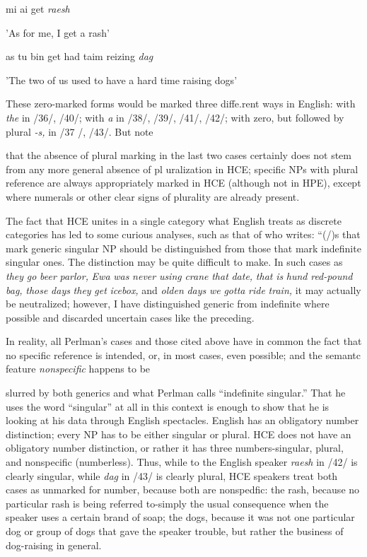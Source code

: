 \ea\label{ex:42}
mi ai get \textit{raesh}
\glt
\z

'As for me, I get a rash'

\ea\label{ex:43}
as tu bin get had taim reizing \textit{dag}
\glt
\z

'The two of us used to have a hard time raising dogs'

These zero-marked forms would be marked three diffe.rent ways in English: with \textit{the }in /36/, /40/; with \textit{a} in /38/, /39/, /41/, /42/; with zero, but followed by plural \textit{{}-s, }in /37 /, /43/. But note

that the absence of plural marking in the last two cases certainly does not stem from any more general absence of pl uralization in HCE; specific NPs with plural reference are always appropriately marked in HCE (although not in HPE), except where numerals or other clear signs of plurality are already present.

The fact that HCE unites in a single category what English treats as discrete categories has led to some curious analyses, such as that of \citet[99]{Perlman1973} who writes: ``(/)s that mark generic singular NP should be distinguished from those that mark indefinite singular ones. The distinction may be quite difficult to make. In such cases as \textit{they} \textit{go} \textit{beer} \textit{parlor,} \textit{Ewa} \textit{was} \textit{never} \textit{using} \textit{crane} \textit{that} \textit{date,} \textit{that} \textit{is} \textit{hund} \textit{red-pound} \textit{bag,} \textit{those }\textit{d}\textit{ays} \textit{they} \textit{get} \textit{icebox,} and \textit{olden} \textit{days} \textit{we} \textit{gotta} \textit{ride} \textit{train,} it may actually be neutralized; however, I have dis\-tinguished generic from indefinite where possible and discarded un\-certain cases like the preceding.{\textquotedbl}

In reality, all Perlman's cases and those cited above have in common the fact that no specific reference is intended, or, in most cases, even possible; and the semantc feature \textit{nonspecific} happens to be


slurred by both generics and what Perlman calls ``indefinite singular.'' That he uses the word ``singular'' at all in this context is enough to show that he is looking at his data through English spectacles. English has an obligatory number distinction; every NP has to be either singular or plural. HCE does not have an obligatory number distinction, or rather it has three numbers-singular, plural, and nonspecific (number\-less). Thus, while to the English speaker \textit{raesh} in /42/ is clearly singular, while \textit{d}\textit{ag} in /43/ is clearly plural, HCE speakers treat both cases as unmarked for number, because both are nonspedfic: the rash, because no particular rash is being referred to-simply the usual consequence when the speaker uses a certain brand of soap; the dogs, because it was not one particular dog or group of dogs that gave the speaker trouble, but rather the business of dog-raising in general.

